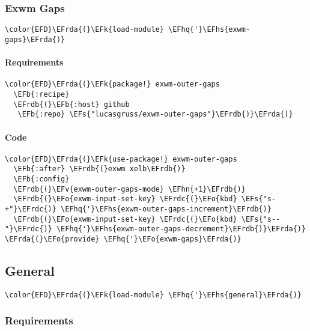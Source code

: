 \documentclass[a4wide,10pt]{article}
\newcommand{\EFs}[1]{\textcolor{EFs}{#1}} %
\newcommand{\EFk}[1]{\textcolor{EFk}{#1}} %
\newcommand{\EFb}[1]{\textcolor{EFb}{#1}} %
\newcommand{\EFv}[1]{\textcolor{EFv}{#1}} %
\newcommand{\EFo}[1]{\textcolor{EFo}{#1}} %
\newcommand{\EFhn}[1]{\textcolor{EFhn}{\textbf{#1}}} %
\newcommand{\EFhq}[1]{\textcolor{EFhq}{#1}} %
\newcommand{\EFhs}[1]{\textcolor{EFhs}{#1}} %
\newcommand{\EFrda}[1]{\textcolor{EFrda}{#1}} %
\newcommand{\EFrdb}[1]{\textcolor{EFrdb}{#1}} %
\newcommand{\EFrdc}[1]{\textcolor{EFrdc}{#1}} %
\begin{document}
\subsubsection{Exwm Gaps}
\label{sec:org2714599}
\begin{Code}
\begin{Verbatim}
\color{EFD}\EFrda{(}\EFk{load-module} \EFhq{'}\EFhs{exwm-gaps}\EFrda{)}
\end{Verbatim}
\end{Code}
\paragraph{Requirements}
\label{sec:orgb2ff4eb}
\begin{Code}
\begin{Verbatim}
\color{EFD}\EFrda{(}\EFk{package!} exwm-outer-gaps
  \EFb{:recipe}
  \EFrdb{(}\EFb{:host} github
   \EFb{:repo} \EFs{"lucasgruss/exwm-outer-gaps"}\EFrdb{)}\EFrda{)}
\end{Verbatim}
\end{Code}
\paragraph{Code}
\label{sec:org41aaef4}
\begin{Code}
\begin{Verbatim}
\color{EFD}\EFrda{(}\EFk{use-package!} exwm-outer-gaps
  \EFb{:after} \EFrdb{(}exwm xelb\EFrdb{)}
  \EFb{:config}
  \EFrdb{(}\EFv{exwm-outer-gaps-mode} \EFhn{+1}\EFrdb{)}
  \EFrdb{(}\EFo{exwm-input-set-key} \EFrdc{(}\EFo{kbd} \EFs{"s-+"}\EFrdc{)} \EFhq{'}\EFhs{exwm-outer-gaps-increment}\EFrdb{)}
  \EFrdb{(}\EFo{exwm-input-set-key} \EFrdc{(}\EFo{kbd} \EFs{"s--"}\EFrdc{)} \EFhq{'}\EFhs{exwm-outer-gaps-decrement}\EFrdb{)}\EFrda{)}
\EFrda{(}\EFo{provide} \EFhq{'}\EFo{exwm-gaps}\EFrda{)}
\end{Verbatim}
\end{Code}
\subsection{General}
\label{sec:org71a6915}
\begin{Code}
\begin{Verbatim}
\color{EFD}\EFrda{(}\EFk{load-module} \EFhq{'}\EFhs{general}\EFrda{)}
\end{Verbatim}
\end{Code}
\subsubsection{Requirements}
\label{sec:orgb0c5fd0}
\end{document}
